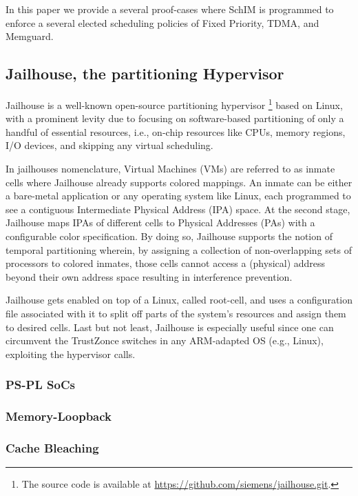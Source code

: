 In this paper we provide a several proof-cases where SchIM is programmed to enforce a several elected scheduling policies of Fixed Priority, TDMA, and Memguard. 






  \subsection{Jailhouse, the partitioning Hypervisor}
    Jailhouse is a well-known open-source partitioning hypervisor \footnote{The source code is available at \url{https://github.com/siemens/jailhouse.git}.} based on Linux,
     with a prominent levity due to focusing on software-based partitioning of only a handful of essential resources, i.e., on-chip resources like CPUs, memory regions, I/O devices, and skipping any virtual scheduling.

    In jailhouses 
    nomenclature, Virtual Machines (VMs) are referred to as inmate cells where Jailhouse already supports colored mappings. An inmate can be either a bare-metal application or any operating system like Linux, each programmed to see a contiguous Intermediate Physical Address (IPA) space. At the second stage, Jailhouse maps IPAs of different cells to Physical Addresses (PAs) with a configurable color specification. By doing so, Jailhouse supports the notion of temporal partitioning wherein, by assigning a collection of non-overlapping sets of processors to colored inmates, those cells cannot access a (physical) address beyond their own address space resulting in interference prevention.

    Jailhouse gets enabled on top of a Linux, called root-cell, and uses a configuration file associated with it to split off parts of the system's resources and assign them to desired cells. Last but not least, Jailhouse is especially useful since one can circumvent the TrustZonce switches in any ARM-adapted OS (e.g., Linux), exploiting the hypervisor calls.

    \subsubsection{PS-PL SoCs}
    \subsubsection{Memory-Loopback}
    \subsubsection{Cache Bleaching}
